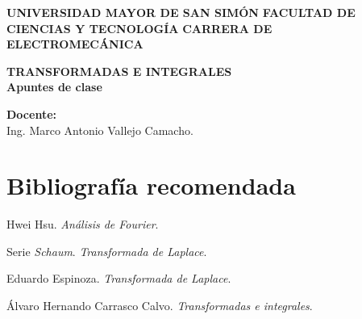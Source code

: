 \documentclass[letter,oneside,11pt]{book}
\begin{document}
\begin{titlepage}
    \begin{center}
        \begin{minipage}[]{.55\linewidth}
            \centering
            \large{\textbf{UNIVERSIDAD MAYOR DE SAN SIMÓN}} \newline
            \large{\textbf{FACULTAD DE CIENCIAS Y TECNOLOGÍA}} \newline
            \large{\textbf{CARRERA DE ELECTROMECÁNICA}} \newline
        \end{minipage}

        \vspace*{8.4cm}
        {\Large \textbf{TRANSFORMADAS E INTEGRALES}}\\
        \vspace*{0.3cm}
        {\Large \textbf{Apuntes de clase}}\\
    \end{center}

    \vspace*{8.4cm}
    \leftskip=7.95cm
    \noindent
    \textbf{Docente:}\\
    Ing. Marco Antonio Vallejo Camacho.\\
\end{titlepage}

\clearpage
\setcounter{page}{1}

\tableofcontents
\newpage

\section*{Bibliografía recomendada}
\begin{enumerate}[{label=[\arabic{*}]}]
\item Hwei Hsu. \emph{Análisis de Fourier}.
\item Serie \emph{Schaum}. \emph{Transformada de Laplace}.
\item Eduardo Espinoza. \emph{Transformada de Laplace}.
\item Álvaro Hernando Carrasco Calvo. \emph{Transformadas e integrales}.
\end{enumerate}





%
%
%
\end{document}
